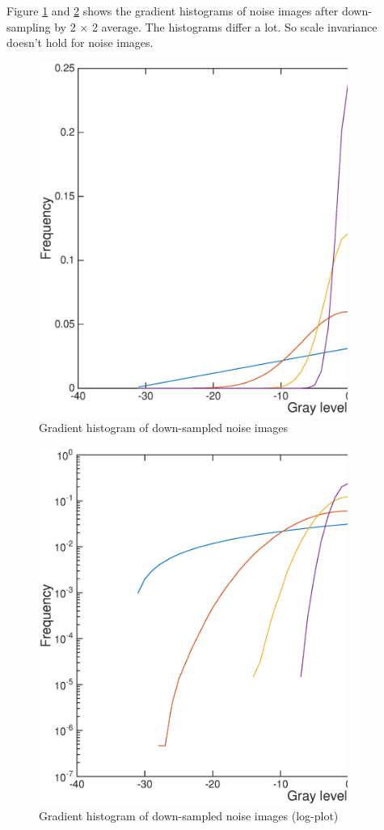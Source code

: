 \documentclass[11pt, oneside]{article}   	%
\begin{document}
\begin{enumerate}
Figure \ref{fig:step65} and \ref{fig:step65log} shows the gradient histograms of noise images after down-sampling by 2 $\times$ 2 average. The histograms differ a lot. So scale invariance doesn't hold for noise images.
\begin{figure}[H]
	\centering
	\includegraphics[width=0.9\textwidth]{step65}
	\caption{Gradient histogram of down-sampled noise images}
	\label {fig:step65}
\end{figure}
\begin{figure}[H]
	\centering
	\includegraphics[width=0.9\textwidth]{step65log}
	\caption{Gradient histogram of down-sampled noise images (log-plot)}
	\label {fig:step65log}
\end{figure}


\end{enumerate}
\end{document}
